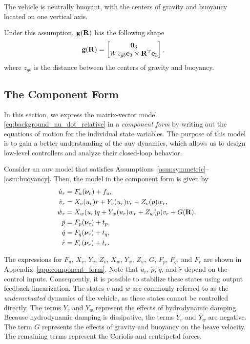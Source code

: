 \begin{asm}
    \label{asm:buoyancy}
    The vehicle is neutrally buoyant, with the centers of gravity and buoyancy located on one vertical axis.
\end{asm}
\noindent Under this assumption, $\mathbf{g}(\mathbf{R})$ has the following shape
\begin{align}
    \mathbf{g}(\mathbf{R}) &= \begin{bmatrix}
        \mathbf{0}_3 \\ Wz_{gb} \mathbf{e}_3 \times \mathbf{R}^{\mathrm{T}} \mathbf{e}_3
    \end{bmatrix},
    \label{eq:gravity}
\end{align}
where $z_{gb}$ is the distance between the centers of gravity and buoyancy.

\subsection{The Component Form}
\label{sec:model_component}
In this section, we express the matrix-vector model \eqref{eq:background_nu_dot_relative} in a \emph{component form} by writing out the equations of motion for the individual state variables.
The purpose of this model is to gain a better understanding of the \gls{auv} dynamics, which allows us to design low-level controllers and analyze their closed-loop behavior.

Consider an \gls{auv} model that satisfies Assumptions~\ref{asm:symmetric}--\ref{asm:buoyancy}.
Then, the model in the component form is given by
\begin{subequations}
    \begin{align}
        \dot{u}_r &= F_u(\bm{\nu}_r) + f_u, \label{eq:background_component_form_u_dot} \\
        \dot{v}_r &= X_v(u_r)r + Y_v(u_r)v_r + Z_v(p)w_r, \\
        \dot{w}_r &= X_w(u_r)q + Y_w(u_r)w_r + Z_w(p)v_r + G(\mathbf{R}), \\
        \dot{p} &= F_p(\bm{\nu}_r) + t_p, \\
        \dot{q} &= F_q(\bm{\nu}_r) + t_q, \\
        \dot{r} &= F_r(\bm{\nu}_r) + t_r.
    \end{align}
    \label{eq:background_component_form}
\end{subequations}

The expressions for $F_u$, $X_v$, $Y_v$, $Z_v$, $X_w$, $Y_w$, $Z_w$, $G$, $F_p$, $F_q$, and $F_r$ are shown in Appendix~\ref{app:component_form}.
Note that $\dot{u}_r$, $\dot{p}$, $\dot{q}$, and $\dot{r}$ depend on the control inputs.
Consequently, it is possible to stabilize these states using output feedback linearization.
The states $v$ and $w$ are commonly referred to as the \emph{underactuated} dynamics of the vehicle, as these states cannot be controlled directly.
The terms $Y_v$ and $Y_w$ represent the effects of hydrodynamic damping.
Because hydrodynamic damping is dissipative, the terms $Y_v$ and $Y_w$ are negative.
The term $G$ represents the effects of gravity and buoyancy on the heave velocity.
The remaining terms represent the Coriolis and centripetal forces.

